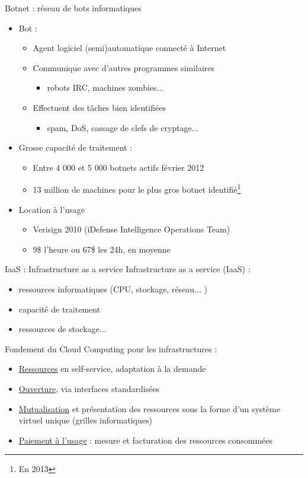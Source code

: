 \begin{frame}{Botnet \cite{wp-botnet} : réseau de bots informatiques}
\begin{itemize}
\item Bot : \begin{itemize}
\item Agent logiciel (semi)automatique connecté à Internet
\item Communique avec d'autres programmes similaires
\begin{itemize}
\item robots IRC, machines zombies...
\end{itemize}
\item Effectuent des tâches bien identifiées
\begin{itemize}
\item spam, DoS, cassage de clefs de cryptage...
\end{itemize}
\end{itemize}

\item Grosse capacité de traitement :
\begin{itemize}
\item Entre 4 000 et 5 000 botnets actifs février 2012
\item 13 million de machines pour le plus gros botnet identifié\footnote{En 2013}
\end{itemize}
\item Location à l'usage
\begin{itemize}
\item Verisign 2010 (iDefense Intelligence Operations Team)
\item 9\$ l'heure ou 67\$ les 24h, en moyenne 
\end{itemize}

\end{itemize}
\end{frame}

\begin{frame}{IaaS : Infrastructure as a service \cite{wp-IaaS}}
Infrastructure as a service (IaaS) :
\begin{itemize}
\item ressources informatiques (CPU, stockage, réseau... )
\item capacité de traitement
\item ressources de stockage...
\end{itemize}

Fondement du Cloud Computing\cite{wp-cloud} pour les infrastructures :
\begin{itemize}
\item \underline{Ressources} en self-service, adaptation à la demande
\item \underline{Ouverture}, via interfaces standardisées
\item \underline{Mutualisation} et présentation des ressources sous la forme d'un système virtuel unique (grilles informatiques)
\item \underline{Paiement à l'usage} : mesure et facturation des ressources consommées
\end{itemize}
\end{frame}

